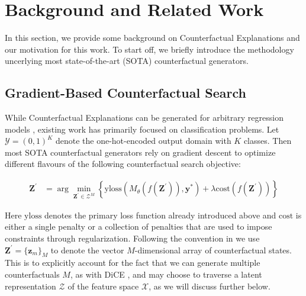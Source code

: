 \documentclass{article}
\begin{document}
\section{Background and Related Work}\label{background}

In this section, we provide some background on Counterfactual Explanations and our motivation for this work. To start off, we briefly introduce the methodology uncerlying most state-of-the-art (SOTA) counterfactual generators.

\subsection{Gradient-Based Counterfactual Search}\label{gradient}

While Counterfactual Explanations can be generated for arbitrary regression models \citep{spooner2021counterfactual}, existing work has primarily focused on classification problems. Let $\mathcal{Y}=(0,1)^K$ denote the one-hot-encoded output domain with $K$ classes. Then most SOTA counterfactual generators rely on gradient descent to optimize different flavours of the following counterfactual search objective:

\begin{equation} \label{eq:general}
\begin{aligned}
\mathbf{Z}^\prime &= \arg \min_{\mathbf{Z}^\prime \in \mathcal{Z}^M} \left\{  {\text{yloss}(M_{\theta}(f(\mathbf{Z}^\prime)),\mathbf{y}^*)}+ \lambda {\text{cost}(f(\mathbf{Z}^\prime)) }  \right\} 
\end{aligned} 
\end{equation}

Here $\text{yloss}$ denotes the primary loss function already introduced above and $\text{cost}$ is either a single penalty or a collection of penalties that are used to impose constraints through regularization. Following the convention in \citet{altmeyer2023endogenous} we use $\mathbf{Z}^\prime=\{ \mathbf{z}_m\}_M$ to denote the vector $M$-dimensional array of counterfactual states. This is to explicitly account for the fact that we can generate multiple counterfactuals $M$, as with DiCE \citep{mothilal2020explaining}, and may choose to traverse a latent representation $\mathcal{Z}$ of the feature space $\mathcal{X}$, as we will discuss further below. 
\end{document}

